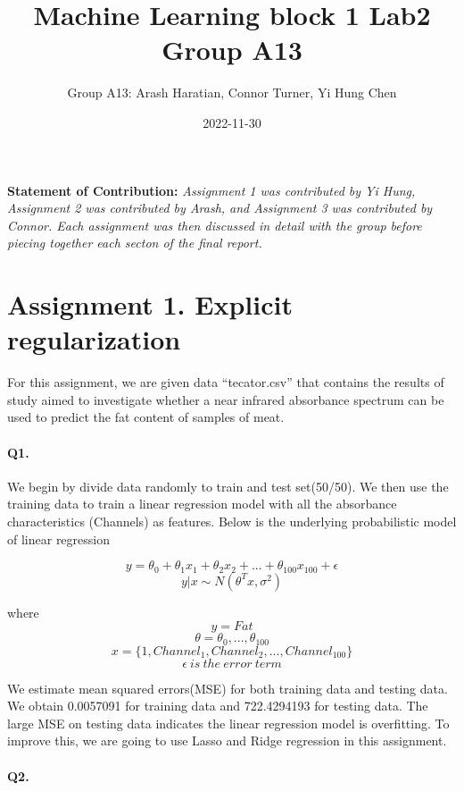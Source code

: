 \documentclass[
]{article}
\title{Machine Learning block 1 Lab2 Group A13}
\author{Group A13: Arash Haratian, Connor Turner, Yi Hung Chen}
\date{2022-11-30}
\begin{document}
\maketitle

\textbf{Statement of Contribution:} \emph{Assignment 1 was contributed
by Yi Hung, Assignment 2 was contributed by Arash, and Assignment 3 was
contributed by Connor. Each assignment was then discussed in detail with
the group before piecing together each secton of the final report.}

\hypertarget{assignment-1.-explicit-regularization}{%
\section{Assignment 1. Explicit
regularization}\label{assignment-1.-explicit-regularization}}

For this assignment, we are given data ``tecator.csv'' that contains the
results of study aimed to investigate whether a near infrared absorbance
spectrum can be used to predict the fat content of samples of meat.

\hypertarget{q1.}{%
\paragraph{Q1.}\label{q1.}}

We begin by divide data randomly to train and test set(50/50). We then
use the training data to train a linear regression model with all the
absorbance characteristics (Channels) as features. Below is the
underlying probabilistic model of linear regression

\[y=\theta_0+\theta_1x_1+\theta_2x_2+...+\theta_{100}x_{100}+\epsilon\]
\[y|x\sim N(\theta^Tx,\sigma^2)\]

where \[y=Fat\] \[ \theta={\theta_0,...,\theta_{100}}\]
\[ x=\{ 1,Channel_1,Channel_2,...,Channel_{100} \}\]
\[ \epsilon \ is\ the\ error\ term\]

We estimate mean squared errors(MSE) for both training data and testing
data. We obtain 0.0057091 for training data and 722.4294193 for testing
data. The large MSE on testing data indicates the linear regression
model is overfitting. To improve this, we are going to use Lasso and
Ridge regression in this assignment.

\hypertarget{q2.}{%
\paragraph{Q2.}\label{q2.}}
\end{document}
